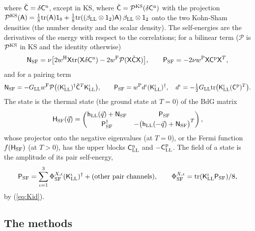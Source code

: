 \documentclass[aps,prd,onecolumn,superscriptaddress,nofootinbib,floatfix,longbibliography]{revtex4-2}
\newcommand{\LL}{{\rm LL}}
\newcommand{\SF}{{\rm SF}}
\newcommand{\tr}{\mathrm{tr}}
\begin{document}
where $\tilde{\mathsf C}=\delta\mathsf C^{\rm n}$, except in KS, where $\tilde{\mathsf C}=\mathcal P^{\rm KS}(\delta\mathsf C^{\rm n})$ with the projection
$\mathcal P^{\rm KS}(\mathsf A)=\frac18\tr(\mathsf A)\mathsf 1_8+\frac18\tr((\beta_\LL\otimes\mathsf 1_2)\mathsf A)\,\beta_\LL\otimes\mathsf 1_2$ onto the two
Kohn-Sham densities (the number density and the scalar density). The self-energies are the derivatives of the energy with
respect to the correlations; for a bilinear term ($\mathcal P$ is $\mathcal P^{\rm KS}$ in KS and the identity otherwise)
\begin{equation}
\mathsf N_\SF=\nu\big[2w^{\rm H}\mathsf X\tr(\mathsf X\delta\mathsf C^{\rm n})-2w^{\rm F}\mathcal P(\mathsf X\tilde{\mathsf C}\mathsf X)\big],\qquad\mathsf P_\SF=-2\nu w^{\rm P}\mathsf X\mathsf C^{\rm p}\mathsf X^T,
\label{eq:Nbil}
\end{equation}
and for a pairing term
\begin{equation}
\mathsf N_\SF=-G_\LL w^{\rm F}\mathcal P\big((\mathsf K^\iota_\LL)^\dagger\tilde{\mathsf C}^T\mathsf K^\iota_\LL\big),\qquad\mathsf P_\SF=w^{\rm P}d^\iota(\mathsf K^\iota_\LL)^\dagger,\quad d^\iota=-\tfrac12G_\LL\tr\big(\mathsf K^\iota_\LL(\mathsf C^{\rm p})^T\big).
\label{eq:Ppair}
\end{equation}
The state is the thermal state (the ground state at $T=0$) of the BdG matrix
\begin{equation}
\mathsf H_\SF(\vec q)=\begin{pmatrix}\mathsf h_\LL(\vec q)+\mathsf N_\SF&\mathsf P_\SF\\\mathsf P_\SF^\dagger&-\big(\mathsf h_\LL(-\vec q)+\mathsf N_\SF\big)^T\end{pmatrix},
\label{eq:BdG}
\end{equation}
whose projector onto the negative eigenvalues (at $T=0$), or the Fermi function $f(\mathsf H_\SF)$ (at $T>0$), has the upper
blocks $\mathsf C^{\rm n}_\LL$ and $-\mathsf C^{\rm p}_\LL$. The field of a state is the amplitude of its pair self-energy,
\begin{equation}
\mathsf P_\SF=\sum_{\iota=1}^3\Phi^{X,\iota}_\SF(\mathsf K^\iota_\LL)^\dagger+(\text{other pair channels}),\qquad\Phi^{X,\iota}_\SF=\tr(\mathsf K^\iota_\LL\mathsf P_\SF)/8,
\label{eq:Phi}
\end{equation}
by (\ref{eq:Kid}).

\subsection{The methods}
\end{document}
